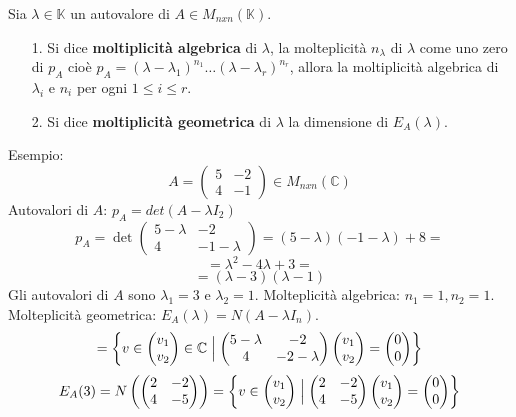 \documentclass[12pt]{article}
\begin{document}
Sia $\lambda \in \mathbb{K}$ un autovalore di $A \in M_{nxn}(\mathbb{K})$.

\begin{enumerate}
    \item[1.] Si dice \textbf{moltiplicità algebrica} di $\lambda$, la molteplicità $n_\lambda$ di $\lambda$ come uno zero di $p_A$ cioè $p_A = (\lambda - \lambda_1)^{n_1} \dots (\lambda - \lambda_r)^{n_r}$, allora la moltiplicità algebrica di $\lambda_i$ e $n_i$ per ogni $1 \le i \le r$.
    \item[2.] Si dice \textbf{moltiplicità geometrica} di $\lambda$ la dimensione di $E_A(\lambda)$.
\end{enumerate}
Esempio:
\[A = \begin{pmatrix}
    5 & -2\\
    4 & -1
\end{pmatrix} \in M_{nxn}(\mathbb{C})\]
Autovalori di $A$:  $p_A = det(A - \lambda I_2)$
\[p_A = \det{\begin{pmatrix}
    5 - \lambda & -2\\
    4 & -1-\lambda
\end{pmatrix}} = (5-\lambda)(-1-\lambda) + 8 = \]
\[= \lambda^2 - 4\lambda + 3 = \]
\[= (\lambda - 3)(\lambda - 1)\]
Gli autovalori di $A$ sono $\lambda_1 = 3$ e $\lambda_2 = 1$.
Molteplicità algebrica: $n_1 = 1, n_2 = 1$.\\
Molteplicità geometrica: $E_A(\lambda) = N(A - \lambda I_n)$.
\[= \left\{v \in \begin{pmatrix}
    v_1\\
    v_2
\end{pmatrix} \in \mathbb{C} \Bigm\vert \begin{pmatrix}
    5-\lambda & -2\\
    4 & -2-\lambda
\end{pmatrix} \begin{pmatrix}
    v_1\\
    v_2
\end{pmatrix} = \begin{pmatrix}
    0\\
    0
\end{pmatrix}\right\}\]
\[E_A(3) = N\left(\begin{pmatrix}
    2 & -2\\
    4 & -5
\end{pmatrix}\right) = \left\{v \in \begin{pmatrix}
    v_1\\
    v_2
\end{pmatrix} \Bigm\vert \begin{pmatrix}
    2 & -2\\
    4 & -5
\end{pmatrix} \begin{pmatrix}
    v_1\\
    v_2
\end{pmatrix} = \begin{pmatrix}
    0\\
    0
\end{pmatrix}\right\}\]
\end{document}
